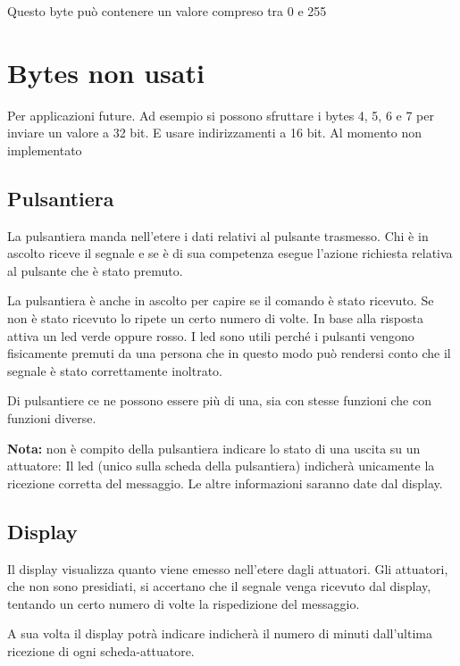 \documentclass[italian]{article}
\begin{document}
    Questo byte può contenere un valore compreso tra 0 e 255
    
    \section*{Bytes non usati}
    
    Per applicazioni future. Ad esempio si possono sfruttare i bytes 4, 5, 6 e 7 per inviare un valore a 32 bit. E usare indirizzamenti a 16 bit. Al momento non implementato
    

	\subsection*{Pulsantiera}
	
	La pulsantiera manda nell'etere i dati relativi al pulsante trasmesso. Chi è in ascolto riceve il segnale e se è di sua competenza esegue l'azione richiesta relativa al pulsante che è stato premuto.
	
	La pulsantiera è anche in ascolto per capire se il comando è stato ricevuto. Se non è stato ricevuto lo ripete un certo numero di volte. In base alla risposta attiva un led verde oppure rosso. I led sono utili perché i pulsanti vengono fisicamente premuti da una persona che in questo modo può rendersi conto che il segnale è stato correttamente inoltrato.
	
	Di pulsantiere ce ne possono essere più di una, sia con stesse funzioni che con funzioni diverse.
	
	\bigskip
	
	\textbf{Nota:} non è compito della pulsantiera indicare lo stato di una uscita su un attuatore: Il led (unico sulla scheda della pulsantiera) indicherà unicamente la ricezione corretta del messaggio. Le altre informazioni saranno date dal display.
	
	\subsection*{Display}
	
	Il display visualizza quanto viene emesso nell'etere dagli attuatori. {\scriptsize Gli attuatori, che non sono presidiati, si accertano che il segnale venga ricevuto dal display, tentando un certo numero di volte la rispedizione del messaggio.}
	
	A sua volta il display potrà indicare indicherà il numero di minuti dall'ultima ricezione di ogni scheda-attuatore.
    
%    
    
\end{document}
